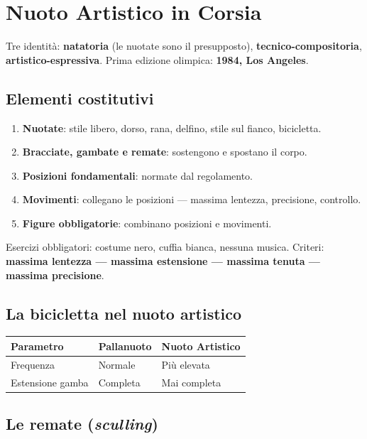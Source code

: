 \documentclass[12pt, a4paper]{article}
\begin{document}
\section{Nuoto Artistico in Corsia}

Tre identità: \textbf{natatoria} (le nuotate sono il presupposto), \textbf{tecnico-compositoria}, \textbf{artistico-espressiva}. Prima edizione olimpica: \textbf{1984, Los Angeles}.

\subsection{Elementi costitutivi}

\begin{enumerate}
  \item \textbf{Nuotate}: stile libero, dorso, rana, delfino, stile sul fianco, bicicletta.
  \item \textbf{Bracciate, gambate e remate}: sostengono e spostano il corpo.
  \item \textbf{Posizioni fondamentali}: normate dal regolamento.
  \item \textbf{Movimenti}: collegano le posizioni --- massima lentezza, precisione, controllo.
  \item \textbf{Figure obbligatorie}: combinano posizioni e movimenti.
\end{enumerate}

Esercizi obbligatori: costume nero, cuffia bianca, nessuna musica. Criteri: \textbf{massima lentezza --- massima estensione --- massima tenuta --- massima precisione}.

\subsection{La bicicletta nel nuoto artistico}

\begin{tabular}{lll}
\toprule
\rowcolor{light} \textbf{Parametro} & \textbf{Pallanuoto} & \textbf{Nuoto Artistico} \\
\midrule
Frequenza & Normale & Più elevata \\
Estensione gamba & Completa & Mai completa \\
\bottomrule
\end{tabular}

\subsection{Le remate (\textit{sculling})}
\end{document}
